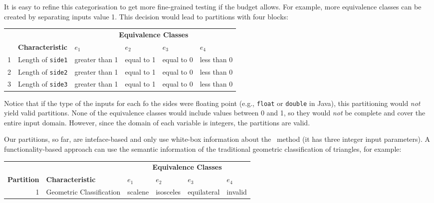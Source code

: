 It is easy to refine this categorisation to get more fine-grained testing if the
budget allows. For example, more equivalence classes can be created by
separating inputs value 1. This decision would lead to partitions with four
blocks:

\begin{center}
\begin{tabular}{rlllll}
    \toprule
    & & \multicolumn{4}{c}{\bf Equivalence Classes} \\
    \cline{3-6}
    & {\bf Characteristic} & $e_1$ & $e_2$ & $e_3$ & $e_4$ \\
    \midrule
    1 & Length of {\tt side1} & greater than 1 & equal to 1 & equal to 0 & less than 0 \\
    2 & Length of {\tt side2} & greater than 1 & equal to 1 & equal to 0 & less than 0 \\
    3 & Length of {\tt side3} & greater than 1 & equal to 1 & equal to 0 & less than 0 \\
    \bottomrule    
\end{tabular}
\end{center}

Notice that if the type of the inputs for each fo the sides were floating point
(e.g., {\tt float} or {\tt double} in Java), this partitioning would {\it not}
yield valid partitions. None of the equivalence classes would include values
between 0 and 1, so they would {\it not} be complete and cover the entire input
domain. However, since the domain of each variable is integers, the partitions
are valid.

Our partitions, so far, are inteface-based and only use white-box information
about the \classifymethod~method (it has three integer input parameters). A
functionality-based approach can use the semantic information of the traditional
geometric classification of triangles, for example:

\begin{center}
\begin{tabular}{rlllll}
    \toprule
    & & \multicolumn{4}{c}{\bf Equivalence Classes} \\
    \cline{3-6}
    {\bf Partition} & {\bf Characteristic} & $e_1$ & $e_2$ & $e_3$ & $e_4$ \\
    \midrule
    1 & Geometric Classification & scalene & isosceles & equilateral & invalid \\
    \bottomrule    
\end{tabular}
\end{center}


